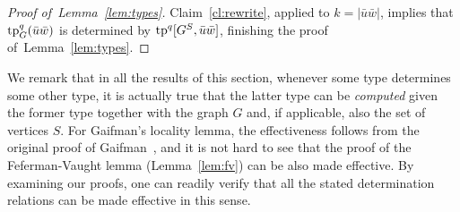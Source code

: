 \begin{proof}[Proof of~Lemma~\ref{lem:types}]
\begin{comment}
For the inductive step, we consider two cases.
If $\phi$ is a boolean combination of formulas $\phi_1,\ldots,\phi_k$, then 
apply the inductive assumption to each formula $\phi_i$,
yielding formulas $\phi_1',\ldots,\phi_k'$. Then let $\phi'$ be the analogous boolean combination of the formulas $\phi_1',\ldots,\phi_k'$.

Finally, suppose that $\phi$ is of the form $\exists x\, \psi$, where   $Y$ are the free variables of $\phi$ and $x\not \in Y$.
 For $w$ being either the variable $x$ 
or an element $s\in S$, 
let $\psi^w$ be the formula obtained from the inductive assumption applied to the formula $\psi$ 
and pre-valuation $\alpha$ extended to a valuation which maps  $x$ to $w$. 
Then let $\phi'$
be the formula $\exists x\, \psi^x \lor \bigvee_{v\in S}\psi^v$.
The case of $\forall$ is dual.

In each case, it follows from the inductive assumption that $\phi'$ 
satisfies the required condition.
\end{clproof}
\end{comment}

Claim~\ref{cl:rewrite}, applied to $k=|\bar u\bar w|$, implies that 
$\mathrm{tp}^q_G(\bar u\bar w)$ is determined by $\mathrm{tp}^q[G^S, \bar u\bar w]$, finishing the proof of~Lemma~\ref{lem:types}.	
\end{proof}

We remark that in all the results of this section, whenever some type determines some other type, it is actually true that the latter type can be {\em{computed}} given the former type together with the graph $G$ 
and, if applicable, also the set of vertices $S$. For Gaifman's locality lemma, the effectiveness follows from the original proof of Gaifman~\cite{gaifman1982local}, and it is not hard to see that the proof of the Feferman-Vaught lemma (Lemma~\ref{lem:fv}) can be also made effective. By examining our proofs, one can readily verify that all the stated determination relations can be made effective in this sense.

